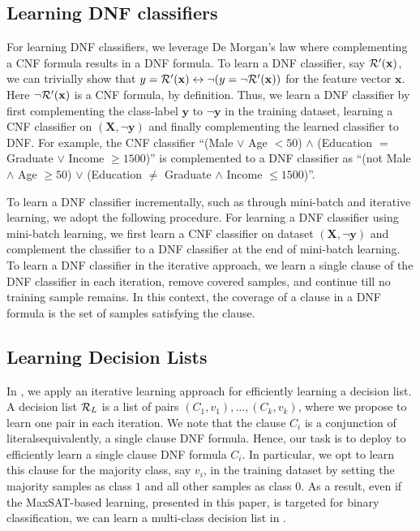 \subsection{Learning DNF classifiers} 
\label{interpretability_imli_sec:dnf_learning}
For learning DNF classifiers, we leverage De Morgan's law where complementing a CNF formula results in a DNF formula. To learn a DNF classifier, say $ {\mathcal{R}}'(\mathbf{x}) $, we can trivially show that $ y = {\mathcal{R}}'(\mathbf{x}) \leftrightarrow \neg (y = \neg {\mathcal{R}}'(\mathbf{x})) $ for the feature vector $ \mathbf{x} $. Here $ \neg {\mathcal{R}}'(\mathbf{x}) $ is a CNF formula, by definition. Thus, we learn a DNF classifier by first complementing the class-label $ \mathbf{y} $ to $ \neg \mathbf{y}$ in the training dataset, learning a CNF classifier on $ (\mathbf{X}, \neg \mathbf{y}) $ and finally complementing the learned classifier to DNF. For example, the CNF classifier  ``(Male $ \vee $ Age $ < 50 $) $ \wedge $ (Education $ = $ Graduate $ \vee $ Income  $ \ge 1500 $)'' 	is complemented to a DNF classifier as 	 ``(not Male $ \wedge $ Age $ \ge 50 $) $ \vee $ (Education $ \ne $ Graduate $ \wedge $ Income $ \le 1500 $)''. 


To learn a DNF classifier incrementally, such as through mini-batch and iterative learning, we adopt the following procedure. For learning a DNF classifier using mini-batch learning, we first learn a CNF classifier on dataset $ (\mathbf{X}, \neg \mathbf{y}) $ and complement the classifier to a DNF classifier at the end of mini-batch learning. To learn a DNF classifier in the iterative approach, we  learn a single clause of the DNF classifier in each iteration, remove covered samples, and continue till no training sample remains. In this context, the coverage of a clause in a DNF formula is the set of samples satisfying the clause. 



\subsection{Learning Decision Lists}
In {\imli}, we apply an iterative learning approach for efficiently learning a  decision list. A decision list  $ {\mathcal{R}}_L $ is a list of pairs $ (C_1, v_1), \dots, (C_k, v_k) $, where we propose to learn one pair in each iteration.  We note that the clause $ C_i $ is a conjunction of literals\textemdash equivalently, a single clause DNF formula. Hence, our task is to deploy {\imli} to efficiently learn a single clause DNF formula $ C_i $. In particular, we opt to learn this clause for the majority class, say $ v_i $, in the training dataset by setting the majority samples as class $ 1 $ and all other samples as class $ 0 $. As a result, even if the MaxSAT-based learning, presented in this paper, is targeted for binary classification, we can learn a multi-class decision list in {\imli}. 


